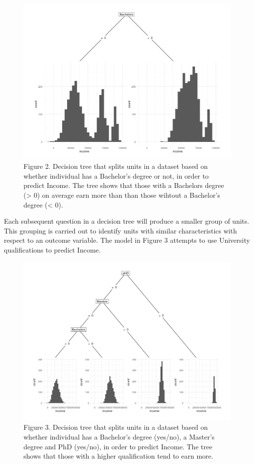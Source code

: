 \documentclass[]{book}
\begin{document}
\begin{figure}
\centering
\includegraphics{images/dt_bach.png}
\caption{Figure 2. Decision tree that splits units in a dataset based on
whether individual has a Bachelor's degree or not, in order to predict
Income. The tree shows that those with a Bachelors degree
(\textgreater{} 0) on average earn more than than those wihtout a
Bachelor's degree (\textless{} 0).}
\end{figure}

Each subsequent question in a decision tree will produce a smaller group
of units. This grouping is carried out to identify units with similar
characteristics with respect to an outcome variable. The model in Figure
3 attempts to use University qualifications to predict Income.

\begin{figure}
\centering
\includegraphics{images/dt_all.png}
\caption{Figure 3. Decision tree that splits units in a dataset based on
whether individual has a Bachelor's degree (yes/no), a Master's degree
and PhD (yes/no), in order to predict Income. The tree shows that those
with a higher qualification tend to earn more.}
\end{figure}
\end{document}
